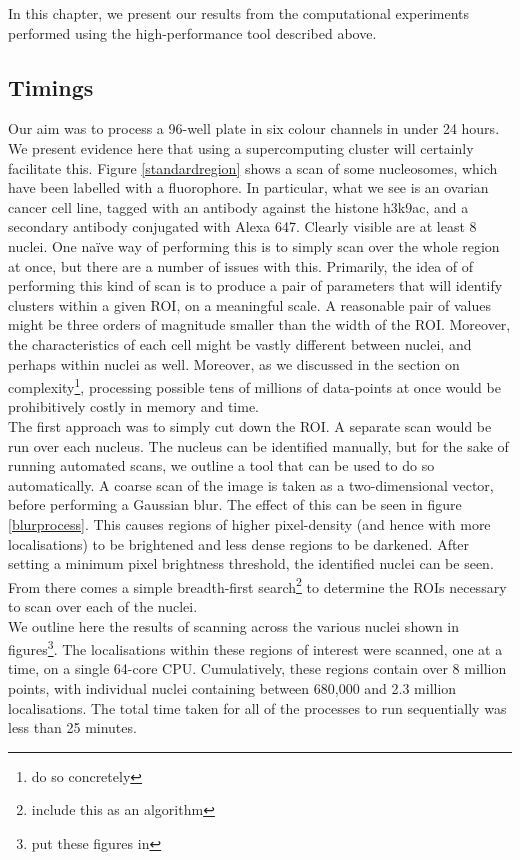\documentclass[11pt]{article}
\begin{document}
In this chapter, we present our results from the computational experiments performed using the high-performance tool described above. 

\subsection{Timings}
\label{timings}
Our aim was to process a 96-well plate in six colour channels in under 24 hours. We present evidence here that using a supercomputing cluster will certainly facilitate this. Figure \ref{standardregion} shows a scan of some nucleosomes, which have been labelled with a fluorophore. In particular, what we see is an ovarian cancer cell line, tagged with an antibody against the histone h3k9ac, and a secondary antibody conjugated with Alexa 647.  Clearly visible are at least 8 nuclei. One na{\"i}ve way of performing this is to simply scan over the whole region at once, but there are a number of issues with this. Primarily, the idea of of performing this kind of scan is to produce a pair of parameters that will identify clusters within a given ROI, on a meaningful scale. A reasonable pair of values might be three orders of magnitude smaller than the width of the ROI. Moreover, the characteristics of each cell might be vastly different between nuclei, and perhaps within nuclei as well. Moreover, as we discussed in the section on complexity\footnote{do so concretely}, processing possible tens of millions of data-points at once would be prohibitively costly in memory and time.\\

The first approach was to simply cut down the ROI. A separate scan would be run over each nucleus. The nucleus can be identified manually, but for the sake of running automated scans, we outline a tool that can be used to do so automatically. A coarse scan of the image is taken as a two-dimensional vector, before performing a Gaussian blur. The effect of this can be seen in figure \ref{blurprocess}. This causes regions of higher pixel-density (and hence with more localisations) to be brightened and less dense regions to be darkened. After setting a minimum pixel brightness threshold, the identified nuclei can be seen. From there comes a simple breadth-first search\footnote{include this as an algorithm} to determine the ROIs necessary to scan over each of the nuclei. \\

We outline here the results of scanning across the various nuclei shown in figures\footnote{put these figures in}. The localisations within these regions of interest were scanned, one at a time, on a single 64-core CPU. Cumulatively, these regions contain over 8 million points, with individual nuclei containing between 680,000 and 2.3 million localisations. The total time taken for all of the processes to run sequentially was less than 25 minutes. \\
\end{document}
